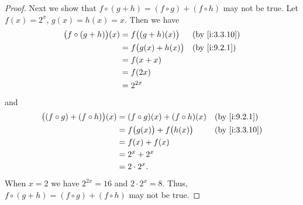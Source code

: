 \begin{proof}
  Next we show that \(f \circ (g + h) = (f \circ g) + (f \circ h)\) may not be true.
  Let \(f(x) = 2^x\), \(g(x) = h(x) = x\).
  Then we have
  \begin{align*}
    \big(f \circ (g + h)\big)(x) & = f\big((g + h)(x)\big)  &  & \by{i:3.3.10} \\
                                 & = f\big(g(x) + h(x)\big) &  & \by{i:9.2.1}  \\
                                 & = f(x + x)                                  \\
                                 & = f(2x)                                     \\
                                 & = 2^{2x}
  \end{align*}
  and
  \begin{align*}
    \big((f \circ g) + (f \circ h)\big)(x) & = (f \circ g)(x) + (f \circ h)(x)   &  & \by{i:9.2.1}  \\
                                           & = f\big(g(x)\big) + f\big(h(x)\big) &  & \by{i:3.3.10} \\
                                           & = f(x) + f(x)                                          \\
                                           & = 2^x + 2^x                                            \\
                                           & = 2 \cdot 2^x.
  \end{align*}
  When \(x = 2\) we have \(2^{2x} = 16\) and \(2 \cdot 2^x = 8\).
  Thus, \(f \circ (g + h) = (f \circ g) + (f \circ h)\) may not be true.


\end{proof}
